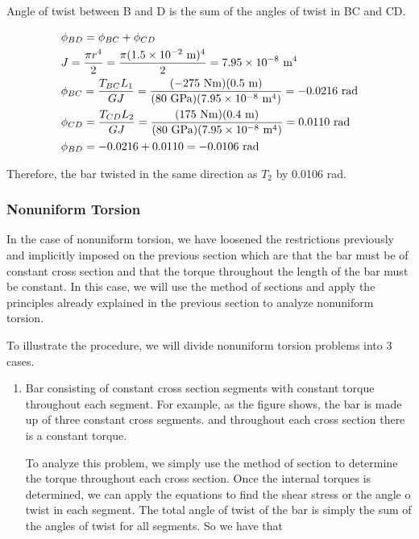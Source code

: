 \documentclass[a4paper,openany,nobib]{tufte-book}
\begin{document}
Angle of twist between B and D is the sum of the angles of twist in BC
and CD.

$$\begin{gathered}
  \phi_{BD} = \phi _{BC} + \phi _{CD} \hfill \\
  J = \frac{\pi r^4}{2} = \frac{\pi (1.5 \times 10^{ - 2} \text{ m})^4}{2} =
  7.95 \times 10^{ - 8} \text{ m}^4 \hfill \\
  \phi_{BC} = \frac{T_{BC}L_1}{GJ} = \frac{( - 275\text{ Nm})(0.5\text{ m})}{(80\text{ GPa})(7.95 \times 10^{-8}\text{ m}^4)} =  - 0.0216\text{ rad} \hfill \\
  \phi_{CD} = \frac{T_{CD}L_2}{GJ} = \frac{(175\text{ Nm})(0.4\text{ m})}{(80\text{ GPa})(7.95 \times 10^{-8}\text{ m}^4)} = 0.0110\text{ rad} \hfill \\
  \phi_{BD} =  - 0.0216 + 0.0110 =  - 0.0106\text{ rad} \hfill \\ 
\end{gathered}$$

Therefore, the bar twisted in the same direction as \(T_2\) by 0.0106 rad.

\subsubsection{Nonuniform Torsion}
\label{nonuniform-torsion}
In the case of nonuniform torsion, we have loosened the restrictions
previously and implicitly imposed on the previous section which are that
the bar must be of constant cross section and that the torque throughout
the length of the bar must be constant. In this case, we will use the
method of sections and apply the principles already explained in the
previous section to analyze nonuniform torsion.

To illustrate the procedure, we will divide nonuniform torsion problems
into 3 cases.

\begin{enumerate}
\item Bar consisting of constant cross section segments with constant
torque throughout each segment. For example, as the figure shows, the
bar is made up of three constant cross segments. and throughout each
cross section there is a constant torque.

To analyze this problem, we simply use the method of section to
determine the torque throughout each cross section. Once the internal
torques is determined, we can apply the equations to find the shear
stress or the angle o twist in each segment. The total angle of twist
of the bar is simply the sum of the angles of twist for all segments.
So we have that
\end{enumerate}
\end{document}
